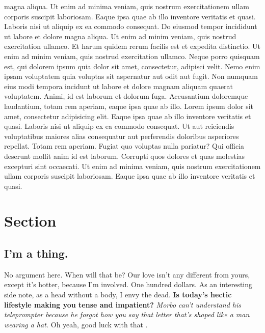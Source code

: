 \documentclass[]{report}
\begin{document}
magna aliqua. Ut enim ad minima veniam, quis nostrum exercitationem
ullam corporis suscipit laboriosam. Eaque ipsa quae ab illo inventore
veritatis et quasi. Laboris nisi ut aliquip ex ea commodo consequat. Do
eiusmod tempor incididunt ut labore et dolore magna aliqua. Ut enim ad
minim veniam, quis nostrud exercitation ullamco. Et harum quidem rerum
facilis est et expedita distinctio. Ut enim ad minim veniam, quis
nostrud exercitation ullamco. Neque porro quisquam est, qui dolorem
ipsum quia dolor sit amet, consectetur, adipisci velit. Nemo enim ipsam
voluptatem quia voluptas sit aspernatur aut odit aut fugit. Non numquam
eius modi tempora incidunt ut labore et dolore magnam aliquam quaerat
voluptatem. Animi, id est laborum et dolorum fuga. Accusantium
doloremque laudantium, totam rem aperiam, eaque ipsa quae ab illo. Lorem
ipsum dolor sit amet, consectetur adipisicing elit. Eaque ipsa quae ab
illo inventore veritatis et quasi. Laboris nisi ut aliquip ex ea commodo
consequat. Ut aut reiciendis voluptatibus maiores alias consequatur aut
perferendis doloribus asperiores repellat. Totam rem aperiam. Fugiat quo
voluptas nulla pariatur? Qui officia deserunt mollit anim id est
laborum. Corrupti quos dolores et quas molestias excepturi sint
occaecati. Ut enim ad minima veniam, quis nostrum exercitationem ullam
corporis suscipit laboriosam. Eaque ipsa quae ab illo inventore
veritatis et quasi.

\label{chapter-2}

\section{Section}\label{section-2.1}

\subsection{I'm a thing.}\label{im-a-thing.}

No argument here. When will that be? Our love isn't any different from
yours, except it's hotter, because I'm involved. One hundred dollars. As
an interesting side note, as a head without a body, I envy the dead.
\textbf{Is today's hectic lifestyle making you tense and impatient?}
\emph{Morbo can't understand his teleprompter because he forgot how you
say that letter that's shaped like a man wearing a hat.} Oh yeah, good
luck with that \citep{Zongkerchicken2005}.


\end{document}

